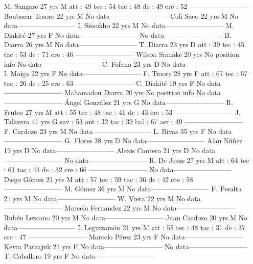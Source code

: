 M. Sangare  27 yrs 
M 
 att : 49 
 tec : 54 
 tac : 48 
 de : 49 
 cre : 52 
--------------------------
Boubacar Traore  22 yrs 
M 
No data--------------------------
Coli Saco  22 yrs 
M 
No data--------------------------
I. Sissokho  22 yrs 
M 
No data--------------------------
M. Diakité  27 yrs 
F 
No data--------------------------
No data--------------------------
B. Diarra  26 yrs 
M 
No data--------------------------
T. Diarra  23 yrs 
D 
 att : 39 
 tec : 45 
 tac : 53 
 de : 71 
 cre : 46 
--------------------------
Wilson Samake  20 yrs 
No position info 
No data--------------------------
C. Fofana  23 yrs 
D 
No data--------------------------
I. Maïga  22 yrs 
F 
No data--------------------------
F. Traore  28 yrs 
F 
 att : 67 
 tec : 67 
 tac : 26 
 de : 25 
 cre : 63 
--------------------------
C. Diakité  19 yrs 
F 
No data--------------------------
Mahamadou Diarra  20 yrs 
No position info 
No data--------------------------
Ángel González  21 yrs 
G 
No data--------------------------
R. Frutos  27 yrs 
M 
 att : 55 
 tec : 48 
 tac : 41 
 de : 43 
 cre : 53 
--------------------------
J. Talavera  41 yrs 
G 
 sav : 53 
 ant : 32 
 tac : 39 
 bal : 67 
 aer : 49 
--------------------------
F. Cardozo  23 yrs 
M 
No data--------------------------
L. Rivas  35 yrs 
F 
No data--------------------------
G. Flores  38 yrs 
D 
No data--------------------------
Alan Núñez  19 yrs 
D 
No data--------------------------
Alexis Cantero  21 yrs 
D 
No data--------------------------
No data--------------------------
R. De Jesus  27 yrs 
M 
 att : 64 
 tec : 61 
 tac : 43 
 de : 32 
 cre : 66 
--------------------------
No data--------------------------
Diego Gómez  21 yrs 
M 
 att : 57 
 tec : 59 
 tac : 36 
 de : 42 
 cre : 58 
--------------------------
M. Gómez  36 yrs 
M 
No data--------------------------
F. Peralta  21 yrs 
M 
No data--------------------------
W. Viera  22 yrs 
M 
No data--------------------------
Marcelo Fernandez  22 yrs 
M 
No data--------------------------
Rubén Lezcano  20 yrs 
M 
No data--------------------------
Juan Cardozo  20 yrs 
M 
No data--------------------------
I. Leguizamón  21 yrs 
M 
 att : 55 
 tec : 48 
 tac : 31 
 de : 37 
 cre : 47 
--------------------------
Marcelo Pérez  23 yrs 
F 
No data--------------------------
Kevin Parzajuk  21 yrs 
F 
No data--------------------------
No data--------------------------
T. Caballero  19 yrs 
F 
No data--------------------------
